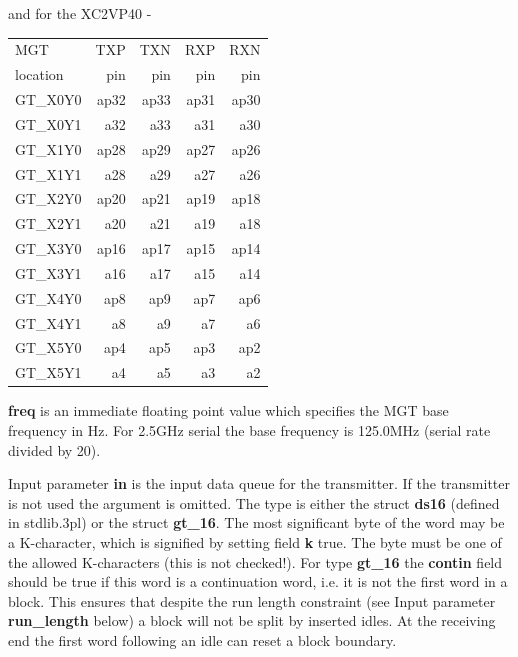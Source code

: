             and for the XC2VP40 -

            \begin{tabular}{| l || r | r | r | r |}
            \hline
            MGT      & TXP  & TXN  & RXP  & RXN  \\
            location & pin  & pin  & pin  & pin  \\
            \hline
            \hline
            GT\_X0Y0 & ap32 & ap33 & ap31 & ap30 \\
            \hline
            GT\_X0Y1 &  a32 &  a33 &  a31 &  a30 \\
            \hline
            GT\_X1Y0 & ap28 & ap29 & ap27 & ap26 \\
            \hline
            GT\_X1Y1 &  a28 &  a29 &  a27 &  a26 \\
            \hline
            GT\_X2Y0 & ap20 & ap21 & ap19 & ap18 \\
            \hline
            GT\_X2Y1 &  a20 &  a21 &  a19 &  a18 \\
            \hline
            GT\_X3Y0 & ap16 & ap17 & ap15 & ap14 \\
            \hline
            GT\_X3Y1 &  a16 &  a17 &  a15 &  a14 \\
            \hline
            GT\_X4Y0 &  ap8 &  ap9 &  ap7 &  ap6 \\
            \hline
            GT\_X4Y1 &   a8 &   a9 &   a7 &   a6 \\
            \hline
            GT\_X5Y0 &  ap4 &  ap5 &  ap3 &  ap2 \\
            \hline
            GT\_X5Y1 &   a4 &   a5 &   a3 &   a2 \\
            \hline
            \end{tabular}
            
            {\bf freq} is an immediate floating point value which specifies the
            MGT base frequency in Hz. For 2.5GHz serial the base frequency
            is 125.0MHz (serial rate divided by 20).
            
            Input parameter {\bf in} is the input data queue for the transmitter.
            If the transmitter is not used the argument is omitted. The type is
            either the struct {\bf ds16} (defined in stdlib.3pl) or the struct
            {\bf gt\_16}. The most significant byte of the word may be a
            K-character, which is signified by setting field {\bf k} true. The
            byte must be one of the allowed K-characters (this is not checked!).
            For type {\bf gt\_16} the {\bf contin} field should be true if this
            word is a continuation word, i.e. it is not the first word in a
            block. This ensures that despite the run length constraint (see
            Input parameter {\bf run\_length} below) a block will not be split
            by inserted idles. At the receiving end the first word following an
            idle can reset a block boundary.

